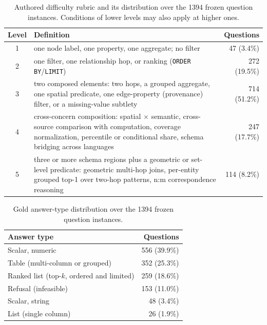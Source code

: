 \documentclass[sigconf,authordraft]{acmart}
\begin{document}
\begin{table}
  \caption{Authored difficulty rubric and its distribution over the \num{1394} frozen question instances. Conditions of lower levels may also apply at higher ones.}
  \label{tab:app_difficulty}
  \begin{tabularx}{\linewidth}{cXr}
    \toprule
    Level & Definition & Questions \\
    \midrule
    1 & one node label, one property, one aggregate; no filter & 47 (3.4\%) \\
    2 & one filter, one relationship hop, or ranking (\texttt{ORDER BY}/\texttt{LIMIT}) & 272 (19.5\%) \\
    3 & two composed elements: two hops, a grouped aggregate, one spatial predicate, one edge-property (provenance) filter, or a missing-value subtlety & 714 (51.2\%) \\
    4 & cross-concern composition: spatial $\times$ semantic, cross-source comparison with computation, coverage normalization, percentile or conditional share, schema bridging across languages & 247 (17.7\%) \\
    5 & three or more schema regions plus a geometric or set-level predicate: geometric multi-hop joins, per-entity grouped top-1 over two-hop patterns, n:m correspondence reasoning & 114 (8.2\%) \\
    \bottomrule
  \end{tabularx}
\end{table}

\begin{table}
  \caption{Gold answer-type distribution over the 1394 frozen question instances.}
  \label{tab:app_answer_types}
  \begin{tabularx}{\linewidth}{Xr}
    \toprule
    Answer type & Questions \\
    \midrule
    Scalar, numeric & 556 (39.9\%) \\
    Table (multi-column or grouped) & 352 (25.3\%) \\
    Ranked list (top-$k$, ordered and limited) & 259 (18.6\%) \\
    Refusal (infeasible) & 153 (11.0\%) \\
    Scalar, string & 48 (3.4\%) \\
    List (single column) & 26 (1.9\%) \\
    \bottomrule
  \end{tabularx}
\end{table}
\end{document}
